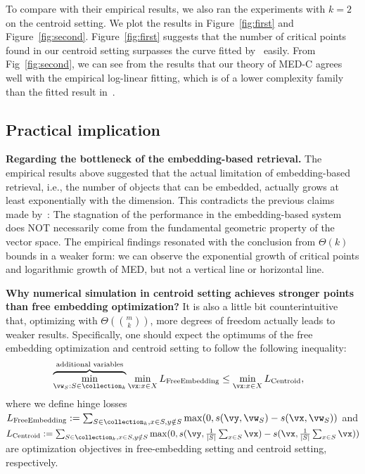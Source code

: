To compare with their empirical results, we also ran the experiments with $k=2$ on the centroid setting. We plot the results in Figure~\ref{fig:first} and Figure~\ref{fig:second}. Figure~\ref{fig:first} suggests that the number of critical points found in our centroid setting surpasses the curve fitted by~\citet{weller2025theoretical} easily. From Fig~\ref{fig:second}, we can see from the results that our theory of MED-C agrees well with the empirical log-linear fitting, which is of a lower complexity family than the fitted result in~\citet{weller2025theoretical}.



\subsection{Practical implication}

\noindent\textbf{Regarding the bottleneck of the embedding-based retrieval.} The empirical results above suggested that the actual limitation of embedding-based retrieval, i.e., the number of objects that can be embedded, actually grows at least exponentially with the dimension. This contradicts the previous claims made by~\citet{weller2025theoretical}: The stagnation of the performance in the embedding-based system does NOT necessarily come from the fundamental geometric property of the vector space. The empirical findings resonated with the conclusion from $\Theta(k)$ bounds in a weaker form: we can observe the exponential growth of critical points and logarithmic growth of MED, but not a vertical line or horizontal line.

\noindent\textbf{Why numerical simulation in centroid setting achieves stronger points than free embedding optimization?}
It is also a little bit counterintuitive that, optimizing with $\Theta(\binom{m}{k})$, more degrees of freedom actually leads to weaker results. Specifically, one should expect the optimums of the free embedding optimization and centroid setting to follow the following inequality:
\begin{align*}
    &\overbrace{\min_{\vw_S: S\in \collection_k}}^{\text{additional variables}} \min_{\vx: x\in X}  L_{\rm Free Embedding} \leq \min_{\vx: x\in X} L_{\rm Centroid},
\end{align*}
where we define hinge losses $L_{\rm Free Embedding} := \sum_{S \in \collection_k,x\in S,y\notin S}\max(0, s(\vy, \vw_S) - s(\vx, \vw_S))$ and $L_{\rm Centroid} :=  \sum_{S \in \collection_k,x\in S,y\notin S}\max(0, s(\vy, \frac{1}{|S|}\sum_{x\in S} \vx) - s(\vx, \frac{1}{|S|}\sum_{x\in S} \vx))$ are optimization objectives in free-embedding setting and centroid setting, respectively.

